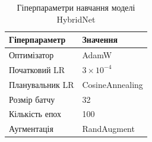 \begin{table}[H]
  \caption{Гіперпараметри навчання моделі HybridNet}
  \label{tbl:hyperparams}
  \centering
  \begin{tabularx}{\linewidth}{|Y|Y|}
    \hline
    \textbf{Гіперпараметр} & \textbf{Значення} \\ \hline
    Оптимізатор     & AdamW              \\ \hline
    Початковий LR   & $3\times10^{-4}$   \\ \hline
    Планувальник LR & CosineAnnealing    \\ \hline
    Розмір батчу    & 32                 \\ \hline
    Кількість епох  & 100                \\ \hline
    Аугментація     & RandAugment        \\ \hline
  \end{tabularx}
\end{table}
